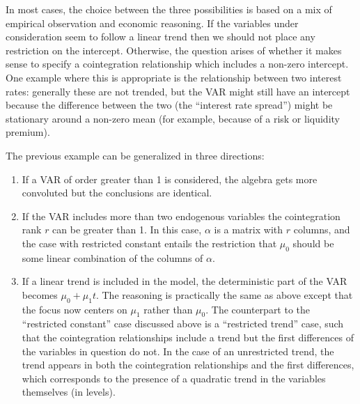 In most cases, the choice between the three possibilities is based on
a mix of empirical observation and economic reasoning. If the
variables under consideration seem to follow a linear trend then we
should not place any restriction on the intercept. Otherwise, the
question arises of whether it makes sense to specify a cointegration
relationship which includes a non-zero intercept. One example where
this is appropriate is the relationship between two interest rates:
generally these are not trended, but the VAR might still have an
intercept because the difference between the two (the ``interest rate
spread'') might be stationary around a non-zero mean (for example,
because of a risk or liquidity premium).
    
The previous example can be generalized in three directions:
    
\begin{enumerate}
\item If a VAR of order greater than 1 is considered, the algebra gets
  more convoluted but the conclusions are identical.
\item If the VAR includes more than two endogenous variables the
  cointegration rank $r$ can be greater than 1. In this case, $\alpha$
  is a matrix with $r$ columns, and the case with restricted constant
  entails the restriction that $\mu_0$ should be some linear
  combination of the columns of $\alpha$.
\item If a linear trend is included in the model, the deterministic
  part of the VAR becomes $\mu_0 + \mu_1 t$. The reasoning is
  practically the same as above except that the focus now centers on
  $\mu_1$ rather than $\mu_0$.  The counterpart to the ``restricted
  constant'' case discussed above is a ``restricted trend'' case, such
  that the cointegration relationships include a trend but the first
  differences of the variables in question do not.  In the case of an
  unrestricted trend, the trend appears in both the cointegration
  relationships and the first differences, which corresponds to the
  presence of a quadratic trend in the variables themselves (in
  levels).
\end{enumerate}

